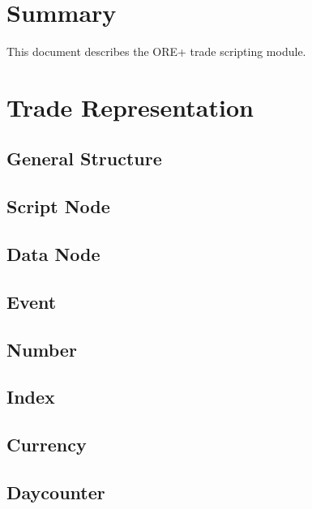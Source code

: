 \documentclass[12pt, a4paper]{article}
\begin{document}
\section{Summary}

This document describes the ORE+ trade scripting module.

\section{Trade Representation}

\subsection{General Structure}\label{generalStructure}


\subsection{Script Node}\label{scriptNode}


\subsection{Data Node}\label{dataNode}


\subsection{Event}\label{event}


\subsection{Number}


\subsection{Index}\label{data_index}


\subsection{Currency}


\subsection{Daycounter}

\end{document}
